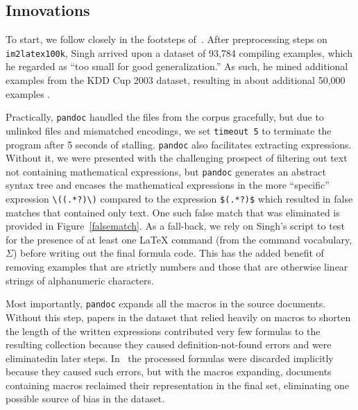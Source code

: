\documentclass{article}
\begin{document}
\subsection{Innovations}
\label{datainnov}

To start, we follow closely in the footsteps of~\citeauthor{singh2018teaching}. After
preprocessing steps on \texttt{im2latex100k}, Singh arrived upon a dataset of
93,784 compiling examples, which he regarded as ``too small for good
generalization.'' As such, he mined additional examples from the KDD Cup 2003
dataset, resulting in about additional 50,000 examples
\parencite[8]{singh2018teaching}.  %

Practically, \texttt{pandoc} handled the files from the corpus gracefully, but
due to unlinked files and mismatched encodings, we set \texttt{timeout 5} to
terminate the program after 5 seconds of stalling. \texttt{pandoc} also
facilitates extracting expressions. Without it, we were presented with the
challenging prospect of filtering out text not containing mathematical
expressions, but \texttt{pandoc} generates an abstract syntax tree and encases
the mathematical expressions in the more ``specific'' expression
\verb|\((.*?)\)| compared to the expression \texttt{\$(.*?)\$} which resulted in
false matches that contained only text. One such false match that was eliminated
is provided in Figure~\ref{falsematch}. As a fall-back, we rely on Singh's script to test
for the presence of at least one \LaTeX{} command (from the command vocabulary,
$\Sigma$) before writing out the final formula code. This has the added benefit
of removing examples that are strictly numbers and those that are otherwise
linear strings of alphanumeric characters.

Most importantly, \texttt{pandoc} expands all the macros in the source
documents. Without this step, papers in the dataset that relied heavily on
macros to shorten the length of the written expressions contributed very few
formulas to the resulting collection because they caused definition-not-found
errors and were eliminatedin later steps. In~\cite{deng2016you} the processed
formulas were discarded implicitly because they caused such errors, but with the
macros expanding, documents containing macros reclaimed their representation in
the final set, eliminating one possible source of bias in the dataset.
\end{document}
